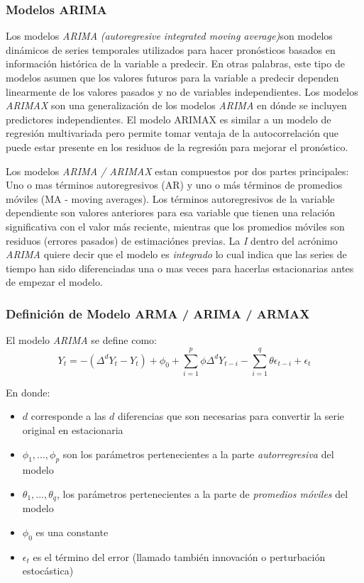 {\subsubsection*{Modelos ARIMA}

Los modelos \emph{ARIMA} \emph{(autoregresive integrated moving average)}son modelos dinámicos de series temporales utilizados para hacer pronósticos basados en información histórica de la variable a predecir. En otras palabras, este tipo de modelos asumen que los valores futuros para la variable a predecir dependen linearmente de los valores pasados y no de variables independientes. Los modelos \emph{ARIMAX} son una generalización de los modelos \emph{ARIMA} en dónde se incluyen predictores independientes. El modelo ARIMAX es similar a un modelo de regresión multivariada pero permite tomar ventaja de la autocorrelación que puede estar presente en los residuos de la regresión para mejorar el pronóstico. 

Los modelos \emph{ARIMA / ARIMAX} estan compuestos por dos partes principales: Uno o mas términos autoregresivos (AR) y uno o más términos de promedios móviles (MA - moving averages). Los términos autoregresivos de la variable dependiente son valores anteriores para esa variable que tienen una relación significativa con el valor más reciente, mientras que los promedios móviles son residuos (errores pasados) de estimaciónes previas. La \emph{I} dentro del acrónimo \emph{ARIMA} quiere decir que el modelo es \emph{integrado} lo cual indica que las series de tiempo han sido diferenciadas una o mas veces para hacerlas estacionarias antes de empezar el modelo.
\subsubsection*{Definición de Modelo ARMA / ARIMA / ARMAX}

El modelo \emph{ARIMA} se define como: $$Y_t = -(\Delta^d Y_t - Y_t) + \phi_0 + \sum_{i=1}^p \phi \Delta^d Y_{t-i} - \sum_{i=1}^q \theta \epsilon_{t-i} + \epsilon_t$$

En donde:
\begin{itemize}
  \item $d$ corresponde a las $d$ diferencias que son necesarias para convertir la serie original en estacionaria
  \item $\phi_1 ,..., \phi_p$ son los parámetros pertenecientes a la parte \emph{autorregresiva} del modelo
  \item $\theta_1 ,..., \theta_q$, los parámetros pertenecientes a la parte de \emph{promedios móviles} del modelo
  \item $\phi_0$ es una constante
  \item $\epsilon_t$ es el término del error (llamado también innovación o perturbación estocástica)
\end{itemize}

}
